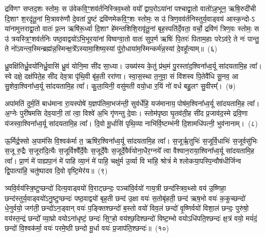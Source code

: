 द्रवि॑णꣳ सप्तद॒शः स्तोमः॒ स उ॑वेकवि॒ꣳ॒शव॑र्तनिस्त्रिव॒थ्सो वयो᳚ द्वाप॒रो\-ऽया॑नां पश्चाद्वा॒तो वातो॑\-ऽह॒भून॒ ऋषि॒रुदी॑ची दि॒शाꣳ श॒रदृ॑तू॒नां मि॒त्रावरु॑णौ दे॒वता॑ पु॒ष्टं द्रवि॑णमेकवि॒ꣳ॒शः स्तोमः॒ स उ॑ त्रिण॒वव॑र्तनिस्तुर्य॒वाड्वय॑ आस्क॒न्दो-\-ऽ या॑नामुत्तराद्वा॒तो वातः॑ प्र॒त्न ऋषि॑रू॒र्ध्वा दि॒शाꣳ हे॑मन्तशिशि॒रावृ॑तू॒नां बृह॒स्पति॑र्दे॒वता॒ वर्चो॒ द्रवि॑णं त्रिण॒वः स्तोमः॒ स उ॑ त्रयस्त्रि॒ꣳ॒शव॑र्तनिः पष्ठ॒वाद्वयो॑\-ऽभि॒भूरया॑नां विष्वग्वा॒तो वातः॑ सुप॒र्ण ऋषिः॑ पि॒तरः॑ पिताम॒हाः परे\-ऽव॑रे॒ ते नः॑ पान्तु॒ ते नो॑\-ऽवन्त्व॒स्मिन्ब्रह्म॑न्न॒स्मिन्क्ष॒त्रे᳚\-ऽस्यामा॒शिष्य॒स्यां पु॑रो॒धाया॑म॒स्मिन्कर्म॑न्न॒स्यां दे॒वहू᳚त्याम्॥~(६)

{\anuvakamend[{विट्प॑ष्ठ॒वाड्वयो॒\-ऽष्टाविꣳ॑शतिश्च}]}%

ध्रु॒वक्षि॑तिर्ध्रु॒वयो॑निर्ध्रु॒वासि॑ ध्रु॒वं योनि॒मा सी॑द सा॒ध्या। उख्य॑स्य के॒तुं प्र॑थ॒मं पु॒रस्ता॑द॒श्विना᳚ध्व॒र्यू सा॑दयतामि॒ह त्वा᳚। स्वे दक्षे॒ दक्ष॑पिते॒ह सी॑द देव॒त्रा पृ॑थि॒वी बृ॑ह॒ती ररा॑णा। स्वा॒स॒स्था त॒नुवा॒ सं वि॑शस्व पि॒तेवै॑धि सू॒नव॒ आ सु॒शेवा॒श्विना᳚ध्व॒र्यू सा॑दयतामि॒ह त्वा᳚। कु॒ला॒यिनी॒ वसु॑मती वयो॒धा र॒यिं नो॑ वर्ध बहु॒लꣳ सु॒वीरम्᳚।~(७)

अपा॑मतिं दुर्म॒तिं बाध॑माना रा॒यस्पोषे॑ य॒ज्ञप॑तिमा॒भज॑न्ती॒ सुव॑र्धेहि॒ यज॑मानाय॒ पोष॑म॒श्विना᳚ध्व॒र्यू सा॑दयतामि॒ह त्वा᳚। अ॒ग्नेः पुरी॑षमसि देव॒यानी॒ तां त्वा॒ विश्वे॑ अ॒भि गृ॑णन्तु दे॒वाः। स्तोम॑पृष्ठा घृ॒तव॑ती॒ह सी॑द प्र॒जाव॑द॒स्मे द्रवि॒णा य॑जस्वा॒श्विना᳚ध्व॒र्यू सा॑दयतामि॒ह त्वा᳚। दि॒वो मू॒र्धासि॑ पृथि॒व्या नाभि॑र्वि॒ष्टम्भ॑नी दि॒शामधि॑पत्नी॒ भुव॑नानाम्।~(८)

ऊ॒र्मिर्द्र॒फ्सो अ॒पाम॑सि वि॒श्वक॑र्मा त॒ ऋषि॑र॒श्विना᳚ध्व॒र्यू सा॑दयतामि॒ह त्वा᳚। स॒जूर्\mbox{}ऋ॒तुभिः॑ स॒जूर्वि॒धाभिः॑ स॒जूर्वसु॑भिः स॒जू रु॒द्रैः स॒जूरा॑दि॒त्यैः स॒जूर्विश्वै᳚र्दे॒वैः स॒जूर्दे॒वैः स॒जूर्दे॒वैर्व॑योना॒धैर॒ग्नये᳚ त्वा वैश्वान॒राया॒श्विना᳚ध्व॒र्यू सा॑दयतामि॒ह त्वा᳚। प्रा॒णं मे॑ पाह्यपा॒नं मे॑ पाहि व्या॒नं मे॑ पाहि॒ चक्षु॑र्म उ॒र्व्या वि भा॑हि॒ श्रोत्रं॑ मे श्लोकया॒पस्पि॒न्वौष॑धीर्जिन्व द्वि॒पात्पा॑हि॒ चतु॑ष्पादव दि॒वो वृष्टि॒मेर॑य॥~(९)

{\anuvakamend[{सु॒वीरं॒ भुव॑नानामु॒र्व्या स॒प्तद॑श च}]}%

त्र्यवि॒र्वय॑स्त्रि॒ष्टुप्छन्दो॑ दित्य॒वाड्वयो॑ वि॒राट्छन्दः॒ पञ्चा॑वि॒र्वयो॑ गाय॒त्री छन्द॑स्त्रिव॒थ्सो वय॑ उ॒ष्णिहा॒ छन्द॑स्तुर्य॒वाड्वयो॑\-ऽ\-नु॒ष्टुप्छन्दः॑ पष्ठ॒वाद्वयो॑ बृह॒ती छन्द॑ उ॒क्षा वयः॑ स॒तोबृ॑हती॒ छन्द॑ ऋष॒भो वयः॑ क॒कुच्छन्दो॑ धे॒नुर्वयो॒ जग॑ती॒ छन्दो॑\-ऽ\-न॒ड्वान् वयः॑ प॒ङ्क्तिश्छन्दो॑ ब॒स्तो वयो॑ विव॒लं छन्दो॑ वृ॒ष्णिर्वयो॑ विशा॒लं छन्दः॒ पुरु॑षो॒ वय॑स्त॒न्द्रं छन्दो᳚ व्या॒घ्रो वयो\-ऽ\-ना॑धृष्टं॒ छन्दः॑ सि॒ꣳ॒हो वय॑श्छ॒दिश्छन्दो॑ विष्ट॒म्भो वयो\-ऽधि॑पति॒श्छन्दः॑ क्ष॒त्रं वयो॒ मयं॑दं॒ छन्दो॑ वि॒श्वक॑र्मा॒ वयः॑ परमे॒ष्ठी छन्दो मू॒र्धा वयः॑ प्र॒जा\-प॑ति॒श्छन्दः॑॥~(१०)

